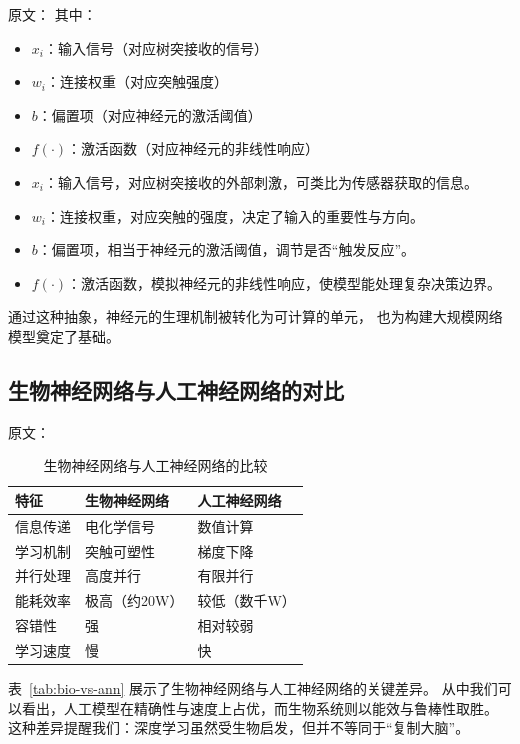 原文：
其中：
\begin{itemize}
\item $x_i$：输入信号（对应树突接收的信号）
\item $w_i$：连接权重（对应突触强度）
\item $b$：偏置项（对应神经元的激活阈值）
\item $f(\cdot)$：激活函数（对应神经元的非线性响应）
\end{itemize}
\begin{itemize}
\item $x_i$：输入信号，对应树突接收的外部刺激，可类比为传感器获取的信息。
\item $w_i$：连接权重，对应突触的强度，决定了输入的重要性与方向。
\item $b$：偏置项，相当于神经元的激活阈值，调节是否“触发反应”。
\item $f(\cdot)$：激活函数，模拟神经元的非线性响应，使模型能处理复杂决策边界。
\end{itemize}
通过这种抽象，神经元的生理机制被转化为可计算的单元，  
也为构建大规模网络模型奠定了基础。


\subsection{生物神经网络与人工神经网络的对比}

原文：
\begin{table}[htbp]
\centering
\caption{生物神经网络与人工神经网络的比较}
\begin{tabular}{|l|l|l|}
\hline
{\bf 特征} & {\bf 生物神经网络} & {\bf 人工神经网络} \\
\hline
信息传递 & 电化学信号 & 数值计算 \\
\hline
学习机制 & 突触可塑性 & 梯度下降 \\
\hline
并行处理 & 高度并行 & 有限并行 \\
\hline
能耗效率 & 极高（约20W） & 较低（数千W） \\
\hline
容错性 & 强 & 相对较弱 \\
\hline
学习速度 & 慢 & 快 \\
\hline
\end{tabular}
\end{table}
表~\ref{tab:bio-vs-ann} 展示了生物神经网络与人工神经网络的关键差异。  
从中我们可以看出，人工模型在精确性与速度上占优，而生物系统则以能效与鲁棒性取胜。  
这种差异提醒我们：深度学习虽然受生物启发，但并不等同于“复制大脑”。  

